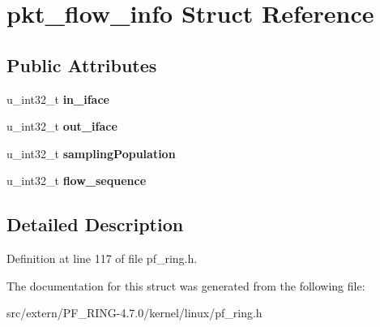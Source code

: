 \hypertarget{structpkt__flow__info}{
\section{pkt\_\-flow\_\-info Struct Reference}
\label{structpkt__flow__info}
}
\subsection*{Public Attributes}
\begin{DoxyCompactItemize}
\item 
\hypertarget{structpkt__flow__info_aa643961b72a8bf8c610b6e1a54fe1776}{
u\_\-int32\_\-t {\bfseries in\_\-iface}}
\label{structpkt__flow__info_aa643961b72a8bf8c610b6e1a54fe1776}

\item 
\hypertarget{structpkt__flow__info_a7aca2b9f0f50ed00532ebf5ba49455e4}{
u\_\-int32\_\-t {\bfseries out\_\-iface}}
\label{structpkt__flow__info_a7aca2b9f0f50ed00532ebf5ba49455e4}

\item 
\hypertarget{structpkt__flow__info_a6767f036319e7d7c2156115a805d91a4}{
u\_\-int32\_\-t {\bfseries samplingPopulation}}
\label{structpkt__flow__info_a6767f036319e7d7c2156115a805d91a4}

\item 
\hypertarget{structpkt__flow__info_a997d9211d3d636f49945f2e7b0a9cede}{
u\_\-int32\_\-t {\bfseries flow\_\-sequence}}
\label{structpkt__flow__info_a997d9211d3d636f49945f2e7b0a9cede}

\end{DoxyCompactItemize}


\subsection{Detailed Description}


Definition at line 117 of file pf\_\-ring.h.



The documentation for this struct was generated from the following file:\begin{DoxyCompactItemize}
\item 
src/extern/PF\_\-RING-\/4.7.0/kernel/linux/pf\_\-ring.h\end{DoxyCompactItemize}
